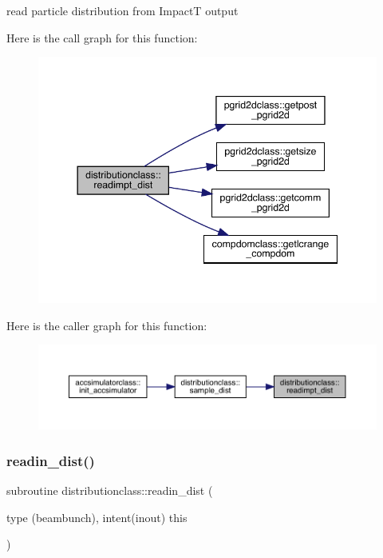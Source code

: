 read particle distribution from ImpactT output 

Here is the call graph for this function\+:\nopagebreak
\begin{figure}[H]
\begin{center}
\leavevmode
\includegraphics[width=344pt]{namespacedistributionclass_ab1d0719de2c779c9d5e8a5f353555193_cgraph}
\end{center}
\end{figure}
Here is the caller graph for this function\+:\nopagebreak
\begin{figure}[H]
\begin{center}
\leavevmode
\includegraphics[width=350pt]{namespacedistributionclass_ab1d0719de2c779c9d5e8a5f353555193_icgraph}
\end{center}
\end{figure}
\mbox{\label{namespacedistributionclass_a4efaf82e4273159a0e2651238502bbf2}} 
\subsubsection{\texorpdfstring{readin\_dist()}{readin\_dist()}}
{\footnotesize\ttfamily subroutine distributionclass\+::readin\+\_\+dist (\begin{DoxyParamCaption}\item[{type (beambunch), intent(inout)}]{this }\end{DoxyParamCaption})}

